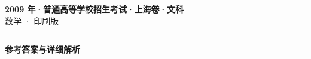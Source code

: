 \documentclass[zihao=5, a4paper]{ctexart}
\begin{document}
\begin{center}
  {\Large\bfseries 2009 年·普通高等学校招生考试·上海卷·文科}\\[4pt]
  {\large 数学 · 印刷版}
\end{center}
\medskip
{}

\par\bigskip\hrule\bigskip
{}
\begin{center}{\large\bfseries 参考答案与详细解析}\end{center}
\smallskip

\end{document}
